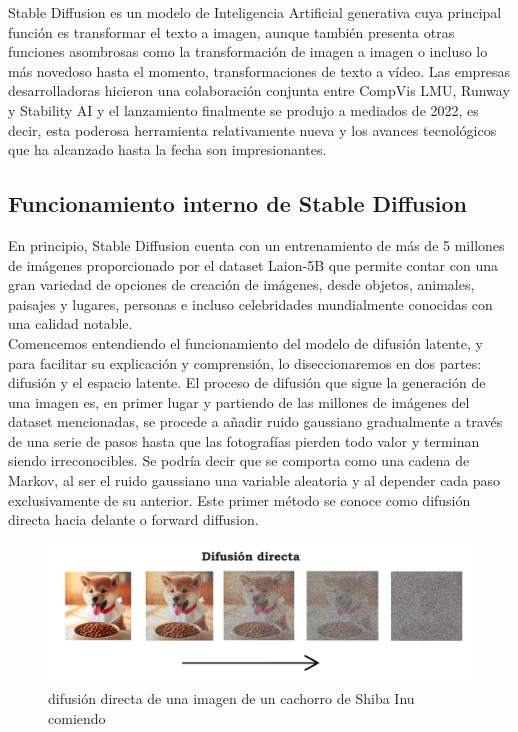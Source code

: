 Stable Diffusion es un modelo de Inteligencia Artificial generativa cuya principal función es transformar el texto a imagen, aunque también presenta otras funciones asombrosas como la transformación de imagen a imagen o incluso lo más novedoso hasta el momento, transformaciones de texto a vídeo. Las empresas desarrolladoras hicieron una colaboración conjunta entre CompVis LMU, Runway y Stability AI y el lanzamiento finalmente se produjo a mediados de 2022, es decir, esta poderosa herramienta relativamente nueva y los avances tecnológicos que ha alcanzado hasta la fecha son impresionantes. \\


\subsection{Funcionamiento interno de Stable Diffusion}

En principio, Stable Diffusion cuenta con un entrenamiento de más de 5 millones de imágenes proporcionado por el dataset Laion-5B que permite contar con una gran variedad de opciones de creación de imágenes, desde objetos, animales, paisajes y lugares, personas e incluso celebridades mundialmente conocidas con una calidad notable.\\ 

Comencemos entendiendo el funcionamiento del modelo de difusión latente, y para facilitar su explicación y comprensión,  lo diseccionaremos en dos partes: difusión y el espacio latente. El proceso de difusión que sigue la generación de una imagen es, en primer lugar y partiendo de las millones de imágenes del dataset mencionadas, se procede a añadir ruido gaussiano gradualmente a través de una serie de pasos hasta que las fotografías pierden todo valor y terminan siendo irreconocibles. Se podría decir que se comporta como una cadena de Markov, al ser el ruido gaussiano una variable aleatoria y al depender cada paso exclusivamente de su anterior. Este primer método se conoce como difusión directa hacia delante o forward diffusion.\\

\begin{figure}[h]
	\centering
	\includegraphics[width = 1 \textwidth]{Imagenes/Vectorial/difusiondirecta.png}
	\caption{difusión directa de una imagen de un cachorro de Shiba Inu comiendo}
	\label{fig:difusiondirecta}
\end{figure}

